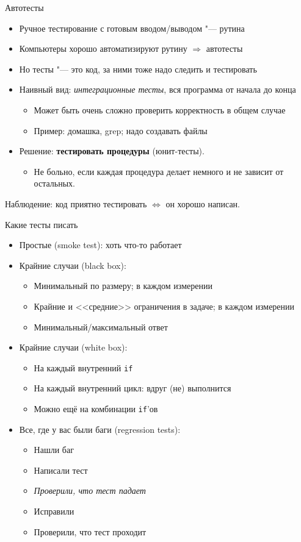 \begin{frame}[t]{Автотесты}
	\begin{itemize}
	\item Ручное тестирование с готовым вводом/выводом "--- рутина
	\item Компьютеры хорошо автоматизируют рутину $\Rightarrow$ автотесты
	\item Но тесты "--- это код, за ними тоже надо следить и тестировать
	\item Наивный вид: \textit{интеграционные тесты}, вся программа от начала до конца
		\begin{itemize}
		\item Может быть очень сложно проверить корректность в общем случае
		\item Пример: домашка, grep; надо создавать файлы
		\end{itemize}
	\item Решение: \textbf{тестировать процедуры} (юнит-тесты).
		\begin{itemize}
		\item Не больно, если каждая процедура делает немного и не зависит от остальных.
		\end{itemize}
	\end{itemize}
	Наблюдение: код приятно тестировать $\iff$ он хорошо написан.
\end{frame}

\begin{frame}[t]{Какие тесты писать}
	\begin{itemize}
	\item Простые (smoke test): хоть что-то работает
	\item Крайние случаи (black box):
		\begin{itemize}
		\item Минимальный по размеру; в каждом измерении
		\item Крайние и <<средние>> ограничения в задаче; в каждом измерении
		\item Минимальный/максимальный ответ
		\end{itemize}
	\item Крайние случаи (white box):
		\begin{itemize}
		\item На каждый внутренний \texttt{if}
		\item На каждый внутренний цикл: вдруг (не) выполнится
		\item Можно ещё на комбинации \texttt{if}'ов
		\end{itemize}
	\item Все, где у вас были баги (regression tests):
		\begin{itemize}
		\item Нашли баг
		\item Написали тест
		\item \textit{Проверили, что тест падает}
		\item Исправили
		\item Проверили, что тест проходит
		\end{itemize}
	\end{itemize}
\end{frame}
